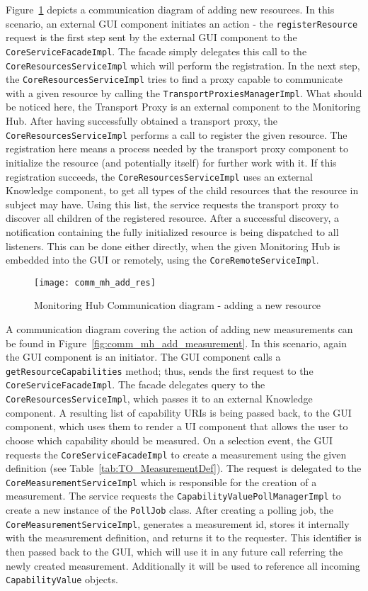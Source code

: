 Figure~\ref{fig:comm_mh_add_res} depicts a communication diagram of adding new resources. In this scenario, an external GUI component initiates an action - the \texttt{registerResource} request is the first step sent by the external GUI component to the \texttt{CoreServiceFacadeImpl}. The facade simply delegates this call to the \texttt{CoreResourcesServiceImpl} which will perform the registration. In the next step, the \texttt{CoreResourcesServiceImpl} tries to find a proxy capable to communicate with a given resource by calling the \texttt{TransportProxiesManagerImpl}. What should be noticed here, the Transport Proxy is an external component to the Monitoring Hub. After having successfully obtained a transport proxy, the \texttt{CoreResourcesServiceImpl} performs a call to register the given resource. The registration here means a process needed by the transport proxy component to initialize the resource (and potentially itself) for further work with it. If this registration succeeds, the \texttt{CoreResourcesServiceImpl} uses an external Knowledge component, to get all types of the child resources that the resource in subject may have. Using this list, the service requests the transport proxy to discover all children of the registered resource. After a successful discovery, a notification containing the fully initialized resource is being dispatched to all listeners. This can be done either directly, when the given Monitoring Hub is embedded into the GUI or remotely, using the \texttt{CoreRemoteServiceImpl}.

\begin{figure}[ht]
\centering
\texttt{[image: comm\_mh\_add\_res]}
\caption{Monitoring Hub Communication diagram - adding a new resource}
\label{fig:comm_mh_add_res}
\end{figure}

A communication diagram covering the action of adding new measurements can be found in Figure~\ref{fig:comm_mh_add_measurement}. In this scenario, again the GUI component is an initiator. The GUI component calls a \texttt{getResourceCapabilities} method; thus, sends the first request to the \texttt{CoreServiceFacadeImpl}. The facade delegates query to the \texttt{CoreResourcesServiceImpl}, which passes it to an external Knowledge component. A resulting list of capability URIs is being passed back, to the GUI component, which uses them to render a UI component that allows the user to choose which capability should be measured. On a selection event, the GUI requests the \texttt{CoreServiceFacadeImpl} to create a measurement using the given definition (see Table~\ref{tab:TO_MeasurementDef}). The request is delegated to the \texttt{CoreMeasurementServiceImpl} which is responsible for the creation of a measurement. The service requests the \texttt{CapabilityValuePollManagerImpl} to create a new instance of the \texttt{PollJob} class. After creating a polling job, the \texttt{CoreMeasurementServiceImpl}, generates a measurement id, stores it internally with the measurement definition, and returns it to the requester. This identifier is then passed back to the GUI, which will use it in any future call referring the newly created measurement. Additionally it will be used to reference all incoming \texttt{CapabilityValue} objects.

